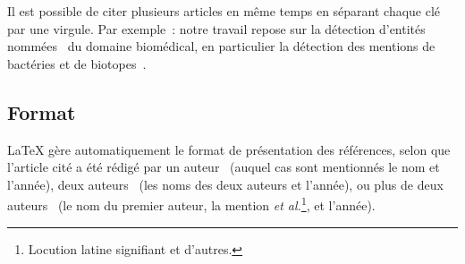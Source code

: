 Il est possible de citer plusieurs articles en même temps en séparant
chaque clé par une virgule. Par exemple~: notre travail repose sur la
détection d'entités nommées~\cite{ehrmann2008phd, sekine-2009} du
domaine biomédical, en particulier la détection des mentions de
bactéries et de biotopes~\cite{bossy-2012bb}.


\subsection{Format}
\LaTeX{} gère automatiquement le format de présentation des
références, selon que l'article cité a été rédigé par un
auteur~\cite{ehrmann2008phd} (auquel cas sont mentionnés le nom et
l'année), deux auteurs~\cite{bretonnel-2008plos} (les noms des deux
auteurs et l'année), ou plus de deux auteurs~\cite{brown-1992cl} (le
nom du premier auteur, la mention \emph{et al.}\footnote{Locution
  latine signifiant \og{}et d'autres\fg{}.}, et l'année).


